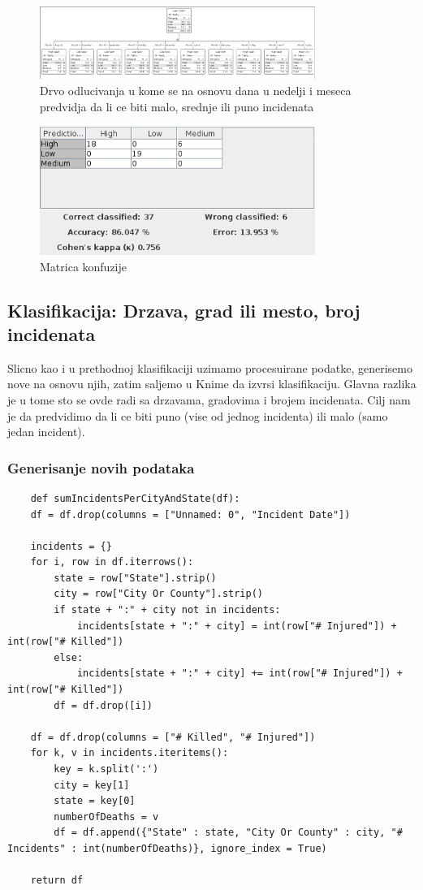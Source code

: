 \documentclass[11pt]{article} %
\begin{document}
	\begin{figure}[h!]
        \includegraphics[width=0.8\textwidth]{klasifikacijaDanMesec}
        \caption{Drvo odlucivanja u kome se na osnovu dana u nedelji i meseca predvidja da li ce biti malo, srednje ili puno incidenata}
	\end{figure}
	
	\begin{figure}[h!]
        \includegraphics[width=0.8\textwidth]{matricaKonfuzije}
        \caption{Matrica konfuzije}
	\end{figure}
	
	\subsection{Klasifikacija: Drzava, grad ili mesto, broj incidenata}
	Slicno kao i u prethodnoj klasifikaciji uzimamo procesuirane podatke, generisemo nove na osnovu njih, zatim saljemo u Knime da izvrsi klasifikaciju. 
	Glavna razlika je u tome sto se ovde radi sa drzavama, gradovima i brojem incidenata. Cilj nam je da predvidimo da li ce biti 
	puno (vise od jednog incidenta) ili malo (samo jedan incident).
	
	\subsubsection{Generisanje novih podataka}
	\begin{lstlisting}
	def sumIncidentsPerCityAndState(df):
	df = df.drop(columns = ["Unnamed: 0", "Incident Date"])

	incidents = {}
	for i, row in df.iterrows():
		state = row["State"].strip()
		city = row["City Or County"].strip()
		if state + ":" + city not in incidents:
			incidents[state + ":" + city] = int(row["# Injured"]) + int(row["# Killed"])
		else:
			incidents[state + ":" + city] += int(row["# Injured"]) + int(row["# Killed"])
		df = df.drop([i])

	df = df.drop(columns = ["# Killed", "# Injured"])
	for k, v in incidents.iteritems():
		key = k.split(':')
		city = key[1]
		state = key[0]
		numberOfDeaths = v
		df = df.append({"State" : state, "City Or County" : city, "# Incidents" : int(numberOfDeaths)}, ignore_index = True)

	return df
	\end{lstlisting}
	
\end{document}
